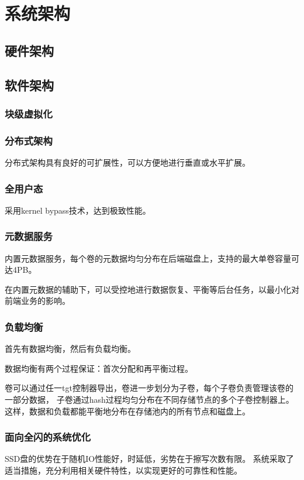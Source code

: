 \chapter{系统架构}

\section{硬件架构}

\section{软件架构}



\subsection{块级虚拟化}

\subsection{分布式架构}

分布式架构具有良好的可扩展性，可以方便地进行垂直或水平扩展。

\subsection{全用户态}

采用kernel bypass技术，达到极致性能。

\subsection{元数据服务}

内置元数据服务，每个卷的元数据均匀分布在后端磁盘上，支持的最大单卷容量可达4PB。

在内置元数据的辅助下，可以受控地进行数据恢复、平衡等后台任务，以最小化对前端业务的影响。

\subsection{负载均衡}

首先有数据均衡，然后有负载均衡。

数据均衡有两个过程保证：首次分配和再平衡过程。

卷可以通过任一tgt控制器导出，卷进一步划分为子卷，每个子卷负责管理该卷的一部分数据，
子卷通过hash过程均匀分布在不同存储节点的多个子卷控制器上。
这样，数据和负载都能平衡地分布在存储池内的所有节点和磁盘上。



\subsection{面向全闪的系统优化}

SSD盘的优势在于随机IO性能好，时延低，劣势在于擦写次数有限。
系统采取了适当措施，充分利用相关硬件特性，以实现更好的可靠性和性能。
